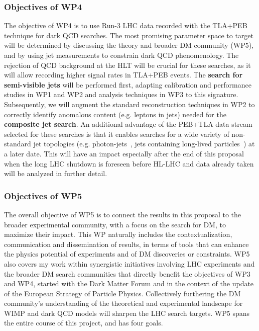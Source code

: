 \subsubsection{Objectives of WP4}

The objective of WP4 is to use Run-3 LHC data recorded with the TLA+PEB technique for dark QCD searches. 
The most promising parameter space to target will be determined by discussing the theory and broader DM community (WP5), and by using jet measurements to constrain dark QCD phenomenology. 
The rejection of QCD background at the HLT will be crucial for these searches, as it will allow recording higher signal rates in TLA+PEB events. 
The \textbf{search for semi-visible jets} will be performed first, adapting calibration and performance studies in WP1 and WP2 and analysis techniques in WP3 to this signature. 
Subsequently, we will augment the standard reconstruction techniques in WP2 to correctly identify anomalous content (e.g. leptons in jets) needed for the \textbf{composite jet search}.
An additional advantage of the PEB+TLA data stream selected for these searches is that it enables searches for a wide variety of non-standard jet topologies (e.g. photon-jets~\cite{ToBeCited}, %
jets containing long-lived particles~\cite{ToBeCited}) %
at a later date. 
This will have an impact especially after the end of this proposal when the long LHC shutdown is foreseen before HL-LHC and data already taken will be analyzed in further detail. 

\subsubsection{Objectives of WP5}

The overall objective of WP5 is to connect the results in this proposal to the broader experimental community, with a focus on the search for DM, to maximize their impact. 
This WP naturally includes the contextualization, communication and dissemination of results, in terms of tools that can enhance the physics potential of experiments and of DM discoveries or constraints. WP5 also covers my work within synergistic initiatives involving LHC experiments and the broader DM search communities that directly benefit the objectives of WP3 and WP4, started with the Dark Matter Forum and in the context of the update of the European Strategy of Particle Physics. Collectively furthering the DM community’s understanding of the theoretical and experimental landscape for WIMP and dark QCD models will sharpen the LHC search targets. WP5 spans the entire course of this project, and has four goals. 

